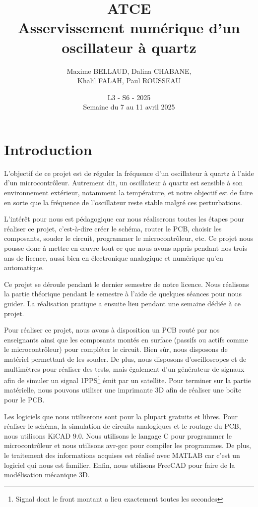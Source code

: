 \documentclass[12pt, a4paper, titlepage]{article}
\title{ATCE \\ Asservissement numérique d'un oscillateur à quartz}
\author{Maxime BELLAUD, Dalina CHABANE,\\ Khalil FALAH, Paul ROUSSEAU}
\date{L3 - S6 - 2025 \\ Semaine du 7 au 11 avril 2025}
\begin{document}
{
\hypersetup{pageanchor=false}
\maketitle
\hypersetup{pageanchor=true}
}

{
\hypersetup{hidelinks}
\tableofcontents
}

\newpage

\section{Introduction}

L'objectif de ce projet est de réguler la fréquence d'un oscillateur à quartz à l'aide d'un microcontrôleur. Autrement dit, un oscillateur à quartz est sensible à son environnement extérieur, notamment la température, et notre objectif est de faire en sorte que la fréquence de l'oscillateur reste stable malgré ces perturbations.

L'intérêt pour nous est pédagogique car nous réaliserons toutes les étapes pour réaliser ce projet, c'est-à-dire créer le schéma, router le PCB, choisir les composants, souder le circuit, programmer le microcontrôleur, etc. Ce projet nous pousse donc à mettre en œuvre tout ce que nous avons appris pendant nos trois ans de licence, aussi bien en électronique analogique et numérique qu'en automatique.

Ce projet se déroule pendant le dernier semestre de notre licence. Nous réalisons la partie théorique pendant le semestre à l'aide de quelques séances pour nous guider. La réalisation pratique a ensuite lieu pendant une semaine dédiée à ce projet.

Pour réaliser ce projet, nous avons à disposition un PCB routé par nos enseignants ainsi que les composants montés en surface (passifs ou actifs comme le microcontrôleur) pour compléter le circuit. Bien sûr, nous disposons de matériel permettant de les souder. De plus, nous disposons d'oscilloscopes et de multimètres pour réaliser des tests, mais également d'un générateur de signaux afin de simuler un signal 1PPS\footnote{Signal dont le front montant a lieu exactement toutes les secondes} émit par un satellite. Pour terminer sur la partie matérielle, nous pouvons utiliser une imprimante 3D afin de réaliser une boîte pour le PCB.

Les logiciels que nous utiliserons sont pour la plupart gratuits et libres. Pour réaliser le schéma, la simulation de circuits analogiques et le routage du PCB, nous utilisons KiCAD 9.0. Nous utilisons le langage C pour programmer le microcontrôleur et nous utilisons avr-gcc pour compiler les programmes. De plus, le traitement des informations acquises est réalisé avec MATLAB car c'est un logiciel qui nous est familier. Enfin, nous utilisons FreeCAD pour faire de la modélisation mécanique 3D.
\end{document}

